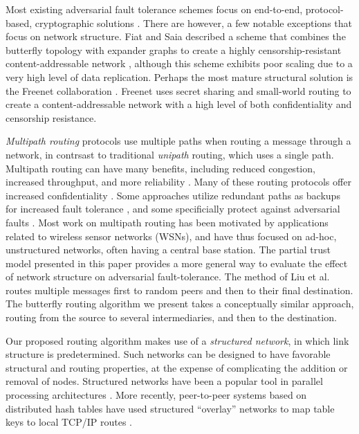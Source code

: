 \documentclass{sig-alternate-05-2015}
\begin{document}
Most existing adversarial fault tolerance schemes focus on end-to-end,
protocol-based, cryptographic solutions
\cite{ferguson_practical_2003}.
There are however, a few notable exceptions that focus on network structure.
Fiat and Saia described a scheme that combines the butterfly topology
with expander graphs to create a highly censorship-resistant content-addressable
network \cite{fiat_censorship_2002},
although this scheme exhibits poor scaling due to a very high level of data
replication.
Perhaps the most mature structural solution is the Freenet collaboration
\cite{clarke_freenet:_2001}.
Freenet uses secret sharing and small-world routing
\cite{zhang_using_2002,kleinberg_small-world_2000}
to create a content-addressable network with a high level of both
confidentiality and censorship resistance.

{\em Multipath routing} protocols use multiple paths when
routing a message through a network,
in contrsast to traditional {\em unipath} routing, which uses
a single path.
Multipath routing can have many benefits, including reduced congestion,
increased throughput, and more reliability
\cite{qadir_exploiting_2015}.
Many of these routing protocols offer increased confidentiality
\cite{zin_survey_2015}.
Some approaches utilize redundant paths as backups for increased
fault tolerance
\cite{alrajeh_secure_2013},
and some specificially protect against adversarial faults
\cite{kohno_improvement_2012, khalil_unmask:_2010, lou_h-spread:_2006}.
Most work on multipath routing has been motivated by applications related to
wireless sensor networks (WSNs),
and have thus focused on ad-hoc, unstructured networks, often having a central
base station.
The partial trust model presented in this paper provides a more general
way to evaluate the effect of network structure on adversarial fault-tolerance.
The method of Liu et al.
\cite{liu_secure_2012}
routes multiple messages first to random peers and then
to their final destination.
The butterfly routing algorithm we present takes a conceptually similar
approach,
routing from the source to several intermediaries, and then to the destination.

Our proposed routing algorithm makes use of a
{\em structured network}, in which link structure is predetermined.
Such networks can be designed to have favorable structural and routing
properties,
at the expense of complicating the addition or removal of nodes.
Structured networks have been a popular tool in parallel processing
architectures \cite{kshemkalyani_distributed_2008}.
More recently, peer-to-peer systems based on distributed hash tables have used
structured ``overlay'' networks to map table keys to local TCP/IP routes
\cite{lua_survey_2005,korzun_structured_2013}.
\end{document}
